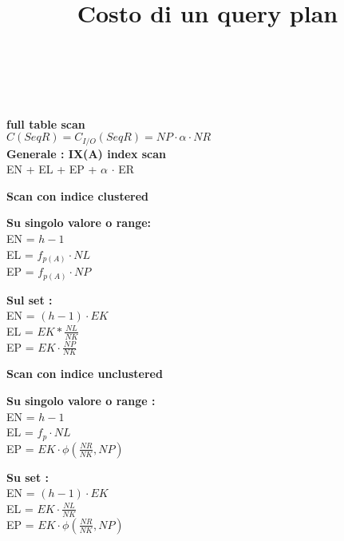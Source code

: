 \documentclass[a4paper,12pt]{article}
\begin{document}
\begin{titlepage}
\begin{titlepage}
		\title{\huge \textbf{Costo di un query plan}} \\ \\
		\maketitle
		\textbf{full table scan} \\
		${C(SeqR) = C_{I/O}(SeqR) = NP \cdot \alpha \cdot NR}$ \\
		\textbf{Generale : IX(A) index scan} \\ 
		EN + EL + EP + $\alpha$ $\cdot$ ER \\ 
	\begin{center}
			\textbf{ \huge Scan con indice clustered} \\
	\end{center}
	\begin{center}
			\textbf{Su singolo valore o range:} \\
		EN = ${h - 1}$ \\
		EL = ${f_{p(A)} \cdot NL}$ \\
		EP = ${f_{p(A)} \cdot NP}$ \\
	\end{center}
	\begin{center}
		\textbf{Sul set :} \\ 
	EN = ${(h - 1) \cdot EK}$ \\
	EL = ${EK * \tfrac{NL}{NK}}$ \\
	EP = ${EK \cdot \tfrac{NP}{NK}}$ \\
	\end{center}
	\begin{center}
		\textbf{ \huge Scan con indice unclustered} \\
	\end{center}
		\begin{center}
			\textbf{Su singolo valore o range : } \\
		EN = ${h - 1}$ \\
		EL = ${f_{p} \cdot NL}$ \\
		EP = ${EK \cdot \phi(\tfrac{NR}{NK},NP)}$ \\
		\end{center} 
		\begin{center}
			\textbf{Su set : } \\
		EN = ${(h - 1) \cdot EK}$ \ \\
		EL = ${EK \cdot \tfrac{NL}{NK}}$ \\
		EP = ${EK \cdot \phi(\tfrac{NR}{NK},NP)}$ \\	

\end{center}
\end{titlepage}
\end{titlepage}
\end{document}
